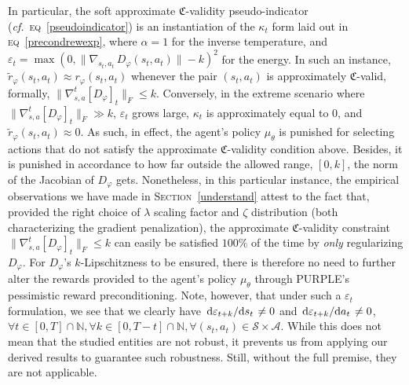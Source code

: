 In particular,
the soft approximate $\mathfrak{C}$-validity pseudo-indicator
(\textit{cf.}~\textsc{eq}~\ref{pseudoindicator})
is an instantiation of the $\kappa_t$ form laid out in \textsc{eq}~\ref{precondrewexp},
where $\alpha=1$ for the inverse temperature, and
$\varepsilon_t = \max (0, \lVert \nabla_{s_t,a_t} \, D_\varphi (s_t,a_t) \rVert - k)^2$ for the energy.
In such an instance, $\tilde{r}_\varphi (s_t,a_t) \approx r_\varphi (s_t,a_t)$
whenever the pair $(s_t,a_t)$ is approximately $\mathfrak{C}$-valid, formally,
$\lVert \nabla_{s,a}^t[D_\varphi]_t \rVert _F \leq k$.
Conversely, in the extreme scenario where $\lVert \nabla_{s,a}^t[D_\varphi]_t \rVert _F \gg k$,
$\varepsilon_t$ grows large,
$\kappa_t$ is approximately equal to $0$,
and $\tilde{r}_\varphi (s_t,a_t) \approx 0$.
As such, in effect, the agent's policy $\mu_\theta$ is punished for selecting actions that do not satisfy the
approximate $\mathfrak{C}$-validity condition above.
Besides, it is punished in accordance to how far outside the allowed
range, $[0,k]$, the norm of the Jacobian of $D_\varphi$ gets.
Nonetheless, in this particular instance,
the empirical observations we have made in \textsc{Section}~\ref{understand}
attest to the fact that, provided the right choice of $\lambda$ scaling factor and $\zeta$ distribution
(both characterizing the gradient penalization),
the approximate $\mathfrak{C}$-validity constraint $\lVert \nabla_{s,a}^t[D_\varphi]_t \rVert _F \leq k$
can easily be satisfied $100\%$ of the time by \emph{only} regularizing $D_\varphi$.
For $D_\varphi$'s $k$-Lipschitzness to be ensured,
there is therefore no need to further alter the rewards provided to the agent's policy $\mu_\theta$
through PURPLE's pessimistic reward preconditioning.
Note, however, that under such a $\varepsilon_t$ formulation, we see that we clearly have
$\dv*{\varepsilon_{t+k}}{s_t} \neq 0$ and $\dv*{\varepsilon_{t+k}}{a_t} \neq 0$,
$\forall t \in [0, T] \cap \mathbb{N}, \forall k \in [0, T-t] \cap \mathbb{N},
\forall (s_t, a_t) \in \mathcal{S} \times \mathcal{A}$.
While this does not mean that the studied entities are not robust,
it prevents us from applying our derived results to guarantee such robustness.
Still, without the full premise, they are not applicable.

